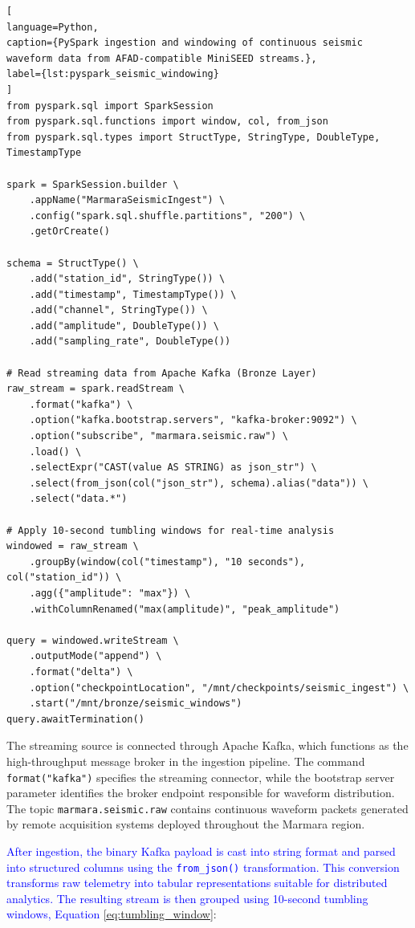 \documentclass[data,article,submit,pdftex,moreauthors]{Definitions/mdpi}
\begin{document}
\begin{lstlisting}[
language=Python,
caption={PySpark ingestion and windowing of continuous seismic waveform data from AFAD-compatible MiniSEED streams.},
label={lst:pyspark_seismic_windowing}
]
from pyspark.sql import SparkSession
from pyspark.sql.functions import window, col, from_json
from pyspark.sql.types import StructType, StringType, DoubleType, TimestampType

spark = SparkSession.builder \
    .appName("MarmaraSeismicIngest") \
    .config("spark.sql.shuffle.partitions", "200") \
    .getOrCreate()

schema = StructType() \
    .add("station_id", StringType()) \
    .add("timestamp", TimestampType()) \
    .add("channel", StringType()) \
    .add("amplitude", DoubleType()) \
    .add("sampling_rate", DoubleType())

# Read streaming data from Apache Kafka (Bronze Layer)
raw_stream = spark.readStream \
    .format("kafka") \
    .option("kafka.bootstrap.servers", "kafka-broker:9092") \
    .option("subscribe", "marmara.seismic.raw") \
    .load() \
    .selectExpr("CAST(value AS STRING) as json_str") \
    .select(from_json(col("json_str"), schema).alias("data")) \
    .select("data.*")

# Apply 10-second tumbling windows for real-time analysis
windowed = raw_stream \
    .groupBy(window(col("timestamp"), "10 seconds"), col("station_id")) \
    .agg({"amplitude": "max"}) \
    .withColumnRenamed("max(amplitude)", "peak_amplitude")

query = windowed.writeStream \
    .outputMode("append") \
    .format("delta") \
    .option("checkpointLocation", "/mnt/checkpoints/seismic_ingest") \
    .start("/mnt/bronze/seismic_windows")
query.awaitTermination()
\end{lstlisting}

The streaming source is connected through Apache Kafka, which functions as the high-throughput message broker in the ingestion pipeline. The command
\texttt{format("kafka")}
specifies the streaming connector, while the bootstrap server parameter identifies the broker endpoint responsible for waveform distribution. The topic
\texttt{marmara.seismic.raw}
contains continuous waveform packets generated by remote acquisition systems deployed throughout the Marmara region.

\textcolor{blue}{After ingestion, the binary Kafka payload is cast into string format and parsed into structured columns using the \texttt{from\_json()} transformation. This conversion transforms raw telemetry into tabular representations suitable for distributed analytics. The resulting stream is then grouped using 10-second tumbling windows, Equation} \ref{eq:tumbling_window}:
\end{document}
